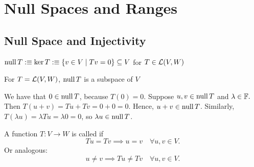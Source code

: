 \section{Null Spaces and Ranges}

\subsection{Null Space and Injectivity}

\begin{mydef} 
  $\operatorname{null} T :\equiv \ker T :\equiv \{ v \in V \mid Tv=0\} \subseteq V$ for $T \in {\mathcal{L}(V,W)}$
\end{mydef}

\setcounter{thm}{12}
\begin{thm} 
  \label{thm: null space is a subspace}
  For $T=\mathcal{L}(V, W)$, $\operatorname{null} T$ is a subspace of $V$
\end{thm}
\begin{prf}
  We have that $0 \in \operatorname{null} T$, because $T(0) = 0$. Suppose $u,v \in \operatorname{null} T$ and $\lambda \in \mathbb{F}.$ Then $T(u+v)=Tu+Tv=0+0=0$. Hence, $u+v \in \operatorname{null} T$. Similarly, $T(\lambda u)= \lambda Tu = \lambda 0 = 0$, so $\lambda u \in \operatorname{null} T$.
\end{prf}

\setcounter{thm}{13}
\begin{mydef} [injectivity]
  \label{def: injectivity}
  A function $T: V \to W$ is called  if
  \begin{equation}
    Tu = Tv \implies u = v \quad \forall u,v \in V.
  \end{equation}
  Or analogous:
  \begin{equation}
    u \neq v \implies Tu \neq Tv \quad \forall u,v \in V.
  \end{equation}
\end{mydef}

